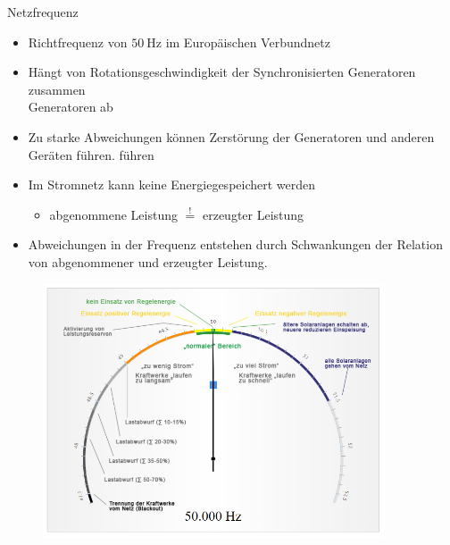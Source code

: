 \documentclass[aspectratio=1610, professionalfonts, 9pt]{beamer}
\begin{document}
\begin{frame}{Netzfrequenz}
\begin{itemize}%
\item Richtfrequenz von $\SI{50}{\hertz}$ im Europäischen Verbundnetz
\item Hängt von Rotationsgeschwindigkeit der Synchronisierten Generatoren zusammen\\
Generatoren ab
\item Zu starke Abweichungen können Zerstörung der Generatoren und anderen Geräten führen.
führen
\item Im Stromnetz kann keine Energiegespeichert werden
  \begin{itemize}
    \item[\rightarrow] abgenommene Leistung $\stackrel{!}{=}$ erzeugter Leistung
  \end{itemize}
  \item Abweichungen in der Frequenz entstehen durch Schwankungen
  der Relation von abgenommener und erzeugter Leistung.
\end{itemize}
\end{frame}

{
\begin{frame}
  \begin{figure}
  \includegraphics[width=0.9\textwidth]{images/Frequenz.png}
  \end{figure}
\end{frame}
}
\end{document}

